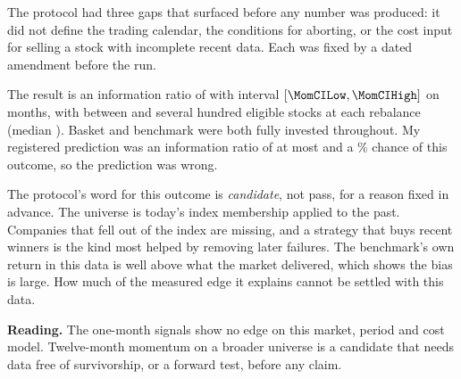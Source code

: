 The protocol had three gaps that surfaced before any number was produced: it did not define the trading calendar, the conditions for aborting, or the cost input for selling a stock with incomplete recent data. Each was fixed by a dated amendment before the run.

The result is an information ratio of \MomIR{} with interval $[\MomCILow, \MomCIHigh]$ on \MomMonths{} months, with between \MomEligibleMin{} and several hundred eligible stocks at each rebalance (median \MomEligibleMedian{}). Basket and benchmark were both fully invested throughout. My registered prediction was an information ratio of at most \MomPredHigh{} and a \MomPredChance\% chance of this outcome, so the prediction was wrong.

The protocol's word for this outcome is \emph{candidate}, not pass, for a reason fixed in advance. The universe is today's index membership applied to the past. Companies that fell out of the index are missing, and a strategy that buys recent winners is the kind most helped by removing later failures. The benchmark's own return in this data is well above what the market delivered, which shows the bias is large. How much of the measured edge it explains cannot be settled with this data.

\textbf{Reading.} The one-month signals show no edge on this market, period and cost model. Twelve-month momentum on a broader universe is a candidate that needs data free of survivorship, or a forward test, before any claim.
